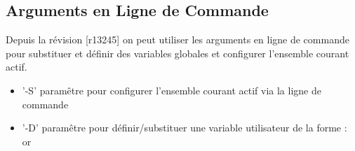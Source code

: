 \subsection{Arguments en Ligne de Commande}\label{sec:cmdline_args}
Depuis la révision [r13245] on peut utiliser les arguments en ligne de commande pour substituer et définir des variables globales et configurer l'ensemble courant actif.
\begin{itemize}
\item '-S' paramêtre pour configurer l'ensemble courant actif via la ligne de commande
\item '-D' paramêtre pour définir/substituer une variable utilisateur de la forme :\\
  or 
\end{itemize}
